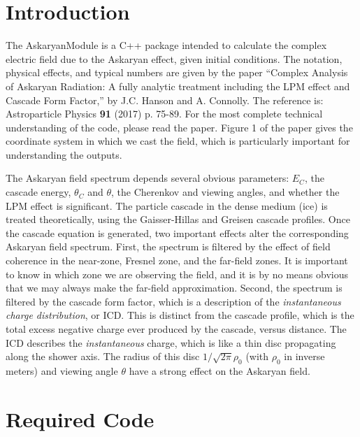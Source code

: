 \documentclass[10pt]{article}
\begin{document}
\maketitle

\section{Introduction}
The AskaryanModule is a C++ package intended to calculate the complex electric field due to the Askaryan effect, given initial conditions.  The notation, physical effects, and typical numbers are given by the paper ``Complex Analysis of Askaryan Radiation: A fully analytic treatment including the LPM effect and Cascade Form Factor,'' by J.C. Hanson and A. Connolly.  The reference is: Astroparticle Physics \textbf{91} (2017) p. 75-89.  For the most complete technical understanding of the code, please read the paper.  Figure 1 of the paper gives the coordinate system in which we cast the field, which is particularly important for understanding the outputs.

The Askaryan field spectrum depends several obvious parameters: $E_C$, the cascade energy, $\theta_C$ and $\theta$, the Cherenkov and viewing angles, and whether the LPM effect is significant.  The particle cascade in the dense medium (ice) is treated theoretically, using the Gaisser-Hillas and Greisen cascade profiles.  Once the cascade equation is generated, two important effects alter the corresponding Askaryan field spectrum.  First, the spectrum is filtered by the effect of field coherence in the near-zone, Fresnel zone, and the far-field zones.  It is important to know in which zone we are observing the field, and it is by no means obvious that we may always make the far-field approximation.  Second, the spectrum is filtered by the cascade form factor, which is a description of the \textit{instantaneous charge distribution}, or ICD.  This is distinct from the cascade profile, which is the total excess negative charge ever produced by the cascade, versus distance.  The ICD describes the \textit{instantaneous} charge, which is like a thin disc propagating along the shower axis.  The radius of this disc $1/\sqrt{2\pi}\rho_0$ (with $\rho_0$ in inverse meters) and viewing angle $\theta$ have a strong effect on the Askaryan field.

\section{Required Code}
\end{document}
